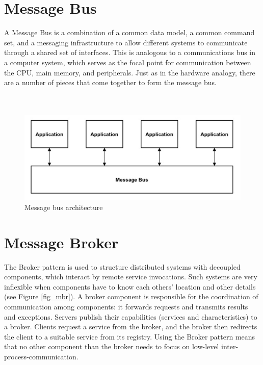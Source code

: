 \documentclass{article}
\begin{document}
\newpage




\section{Message Bus}
A Message Bus is a combination of a common data model, a common command set, and a messaging infrastructure to allow different systems to communicate through a shared set of interfaces. This is analogous to a communications bus in a computer system, which serves as the focal point for communication between the CPU, main memory, and peripherals. Just as in the hardware analogy, there are a number of pieces that come together to form the message bus.\\\\\\


\begin{figure}[h]
\centering
\includegraphics[scale=0.55]{mb.jpg}
\caption{Message bus architecture}
\label{fig_mb}
\end{figure}
\newpage



\section{Message Broker}
The Broker pattern is used to structure distributed systems with decoupled components, which interact by remote service invocations. Such systems are very inflexible when components have to know each others' location and other details (see Figure \ref{fig_mbr}). A broker component is responsible for the coordination of communication among components: it forwards requests and transmits results and exceptions. Servers publish their capabilities (services and characteristics) to a broker. Clients request a service from the broker, and the broker then redirects the client to a suitable service from its registry. Using the Broker pattern means that no other component than the broker needs to focus on low-level inter-process-communication.\\\\
\end{document}
